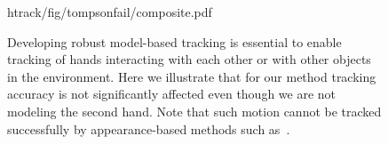 \begin{figure}[t]
\centering
\begin{overpic} 
[width=\linewidth]
{htrack/fig/tompsonfail/composite.pdf}
\putfilename
\end{overpic}
\caption{
% 
Developing robust model-based tracking is essential to enable tracking of hands interacting with each other or with other objects in the environment.
Here we illustrate that for our method tracking accuracy is not significantly affected even though we are not modeling the second hand.
Note that such motion cannot be tracked successfully by appearance-based methods such as~\protect\cite{tompson2014real}.
% 
% 
} %
\label{fig:tompsonfail}
\end{figure}